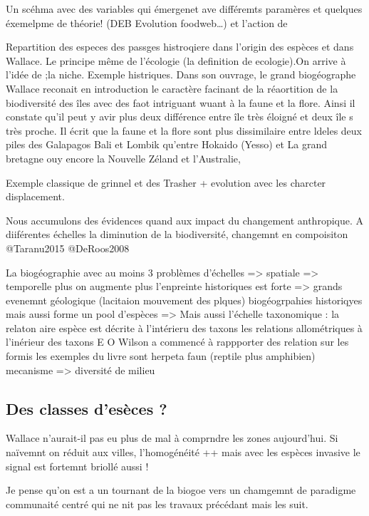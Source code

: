 Un scéhma avec des variables qui émergenet ave différemts paramères et
quelques éxemelpme de théorie! (DEB Evolution foodweb\ldots{}) et
l'action de

Repartition des especes des passges histroqiere dans l'origin des
espèces et dans Wallace. Le principe même de l'écologie (la definition
de ecologie).On arrive à l'idée de ;la niche. Exemple histriques. Dans
son ouvrage, le grand biogéographe Wallace reconait en introduction le
caractère facinant de la réaortition de la biodiversité des îles avec
des faot intriguant wuant à la faune et la flore. Ainsi il constate
qu'il peut y avir plus deux différence entre île très éloigné et deux
île s très proche. Il écrit que la faune et la flore sont plus
dissimilaire entre ldeles deux piles des Galapagos Bali et Lombik
qu'entre Hokaido (Yesso) et La grand bretagne ouy encore la Nouvelle
Zéland et l'Australie,

Exemple classique de grinnel et des Trasher + evolution avec les
charcter displacement.

Nous accumulons des évidences quand aux impact du changement
anthropique. A diiférentes échelles la diminution de la biodiversité,
changemnt en compoisiton @Taranu2015 @DeRoos2008

La biogéographie avec au moins 3 problèmes d'échelles =\textgreater{}
spatiale =\textgreater{} temporelle plus on augmente plus l'enpreinte
historiques est forte =\textgreater{} grands evenemnt géologique
(lacitaion mouvement des plques) biogéogrpahies historiqyes mais aussi
forme un pool d'espèces =\textgreater{} Mais aussi l'échelle taxonomique
: la relaton aire espèce est décrite à l'intérieru des taxons les
relations allométriques à l'inérieur des taxons E O Wilson a commencé à
rappporter des relation sur les formis les exemples du livre sont
herpeta faun (reptile plus amphibien) mecanisme =\textgreater{}
diversité de milieu

\subsection{Des classes d'esèces ?}\label{des-classes-desuxe8ces}

Wallace n'aurait-il pas eu plus de mal à comprndre les zones
aujourd'hui. Si naïvemnt on réduit aux villes, l'homogénéité ++ mais
avec les espèces invasive le signal est fortemnt briollé aussi !

Je pense qu'on est a un tournant de la biogoe vers un chamgemnt de
paradigme communaité centré qui ne nit pas les travaux précédant mais
les suit.

